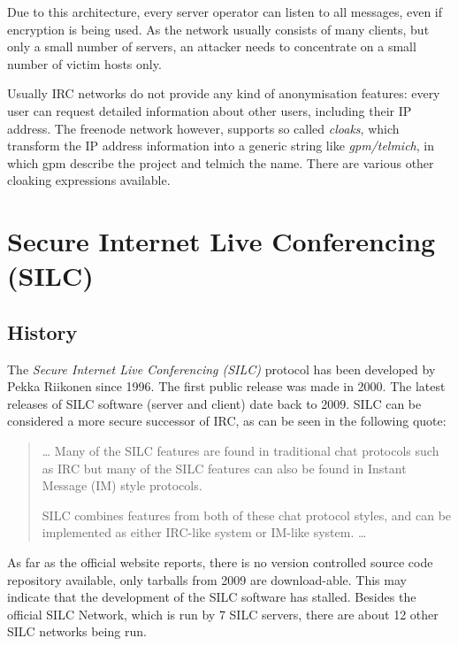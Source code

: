 Due to this architecture, every server operator can listen to all
messages, even if encryption is being used. As the network usually consists
of many clients, but only a small number of servers, an attacker needs
to concentrate on a small number of victim hosts only.

Usually IRC networks do not provide any kind of anonymisation features:
every user can request detailed information about other users, including
their IP address.  The freenode network\cite{freenode} however,
supports so called \textit{cloaks}, which transform the IP address information
into a generic string like \textit{gpm/telmich}, in which gpm describe the
project and telmich the name. There are various other cloaking expressions
available.
\section{Secure Internet Live Conferencing (SILC)}
\subsection{History}
The \textit{Secure Internet Live Conferencing (SILC)} protocol
has been developed by Pekka Riikonen since 1996. The first public release
was made in 2000. The latest releases of SILC software (server and client)
date back to 2009. SILC can be considered a more secure successor of IRC,
as can be seen in the following quote:
\begin{quote}
\ldots{}
Many of the SILC features are found in traditional chat protocols such 
as IRC but many of the SILC features can also be found in 
Instant Message (IM) style protocols.

SILC combines features from both of these chat protocol styles, 
and can be implemented as either IRC-like system 
or IM-like system. \ldots{}\cite{silcwp}
\end{quote}
As far as the official website reports,
there is no version controlled source code repository available,
only tarballs from 2009 are download-able. This may indicate that the
development of the SILC software has stalled.
Besides the official SILC Network, which is run by 7 SILC servers,
there are about 12 other SILC networks being run.\cite{wiki:silc}
